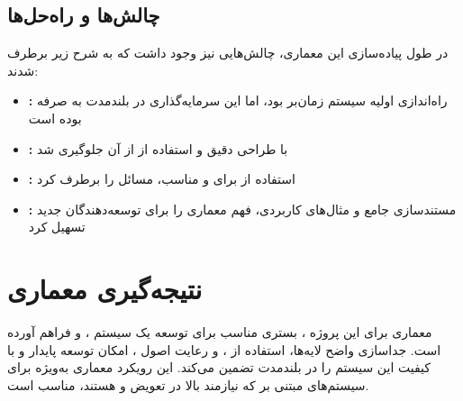 \subsection{چالش‌ها و راه‌حل‌ها}

در طول پیاده‌سازی این معماری، چالش‌هایی نیز وجود داشت که به شرح زیر برطرف شدند:

\begin{itemize}
    \item \textbf{:} راه‌اندازی اولیه سیستم زمان‌بر بود، اما این سرمایه‌گذاری در بلندمدت به صرفه بوده است
    
    \item \textbf{:} با طراحی دقیق  و استفاده از  از آن جلوگیری شد
    
    \item \textbf{:} استفاده از  برای  و  مناسب، مسائل  را برطرف کرد
    
    \item \textbf{:} مستندسازی جامع و مثال‌های کاربردی، فهم معماری را برای توسعه‌دهندگان جدید تسهیل کرد
\end{itemize}

\newpage

\section{نتیجه‌گیری معماری}

معماری  برای این پروژه ، بستری مناسب برای توسعه یک سیستم ،  و  فراهم آورده است. جداسازی واضح لایه‌ها، استفاده از ، و رعایت اصول ، امکان توسعه پایدار و با کیفیت این سیستم را در بلندمدت تضمین می‌کند. این رویکرد معماری به‌ویژه برای سیستم‌های مبتنی بر  که نیازمند  بالا در تعویض  و  هستند، مناسب است.
